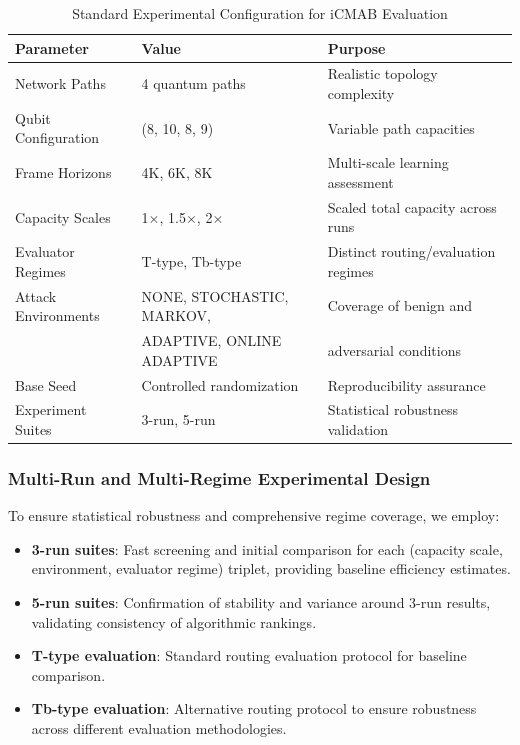 \documentclass[12pt,a4paper]{article}
\begin{document}
\begin{table}[H]
\centering
\caption{Standard Experimental Configuration for iCMAB Evaluation}
\begin{tabular}{|l|l|l|}
\hline
\textbf{Parameter} & \textbf{Value} & \textbf{Purpose} \\
\hline
\hline
Network Paths & 4 quantum paths & Realistic topology complexity \\
Qubit Configuration & (8, 10, 8, 9) & Variable path capacities \\
Frame Horizons & 4K, 6K, 8K & Multi-scale learning assessment \\
Capacity Scales & 1$\times$, 1.5$\times$, 2$\times$ & Scaled total capacity across runs \\
Evaluator Regimes & T-type, Tb-type & Distinct routing/evaluation regimes \\
Attack Environments & NONE, STOCHASTIC, MARKOV, & Coverage of benign and \\
 & ADAPTIVE, ONLINE ADAPTIVE & adversarial conditions \\
Base Seed & Controlled randomization & Reproducibility assurance \\
Experiment Suites & 3-run, 5-run & Statistical robustness validation \\
\hline
\end{tabular}
\end{table}

\subsubsection{Multi-Run and Multi-Regime Experimental Design}

To ensure statistical robustness and comprehensive regime coverage, we employ:

\begin{itemize}
\item \textbf{3-run suites}: Fast screening and initial comparison for each (capacity scale, environment, evaluator regime) triplet, providing baseline efficiency estimates.
\item \textbf{5-run suites}: Confirmation of stability and variance around 3-run results, validating consistency of algorithmic rankings.
\item \textbf{T-type evaluation}: Standard routing evaluation protocol for baseline comparison.
\item \textbf{Tb-type evaluation}: Alternative routing protocol to ensure robustness across different evaluation methodologies.
\end{itemize}
\end{document}
